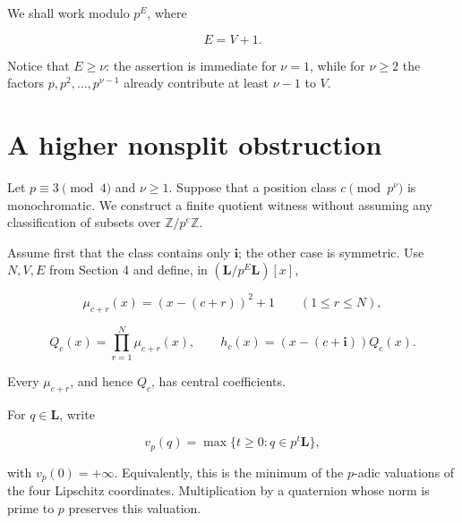 \documentclass[11pt]{article}
\numberwithin{equation}{section}
\begin{document}
We shall work modulo $p^E$, where

\[
E=V+1.
\]

Notice that $E\ge\nu$: the assertion is immediate for $\nu=1$, while for
$\nu\ge2$ the factors $p,p^2,\ldots,p^{\nu-1}$ already contribute at least
$\nu-1$ to $V$.

\section{A higher nonsplit obstruction}


Let $p\equiv3\pmod4$ and $\nu\ge1$. Suppose that a position class
$c\pmod {p^\nu}$ is monochromatic. We construct a finite quotient witness
without assuming any classification of subsets over $\mathbb Z/p^e\mathbb Z$.

Assume first that the class contains only $\mathbf i$; the other case is
symmetric. Use $N,V,E$ from Section 4 and define, in
$(\mathbf L/p^E\mathbf L)[x]$,

\[
\mu_{c+r}(x)=(x-(c+r))^2+1
\qquad(1\le r\le N),
\]

\[
Q_c(x)=\prod_{r=1}^{N}\mu_{c+r}(x),
\qquad
h_c(x)=(x-(c+\mathbf i))Q_c(x).
\]

Every $\mu_{c+r}$, and hence $Q_c$, has central coefficients.

For $q\in\mathbf L$, write

\[
v_p(q)=\max\{t\ge0:q\in p^t\mathbf L\},
\]

with $v_p(0)=+\infty$. Equivalently, this is the minimum of the $p$-adic
valuations of the four Lipschitz coordinates. Multiplication by a quaternion
whose norm is prime to $p$ preserves this valuation.
\end{document}
